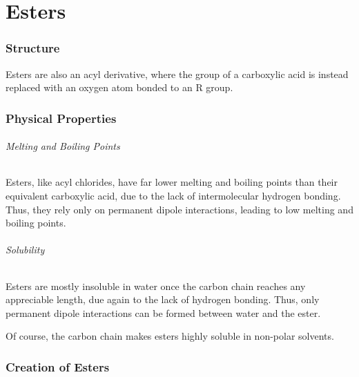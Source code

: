 

\pagebreak
\hypertarget{ChapterEsters}{}
\part{Esters}

	\section{Structure}

		Esters are also an acyl derivative, where the  group of a carboxylic acid is instead replaced with an oxygen atom
		bonded to an R group.





	\section{Physical Properties}

		\paragraph{Melting and Boiling Points}

		Esters, like acyl chlorides, have far lower melting and boiling points than their equivalent carboxylic acid, due to the lack of
		intermolecular hydrogen bonding. Thus, they rely only on permanent dipole interactions, leading to low melting and boiling points.


		\paragraph{Solubility}

		Esters are mostly insoluble in water once the carbon chain reaches any appreciable length, due again to the lack of hydrogen bonding.
		Thus, only permanent dipole interactions can be formed between water and the ester.

		Of course, the carbon chain makes esters highly soluble in non-polar solvents.




	\section{Creation of Esters}

